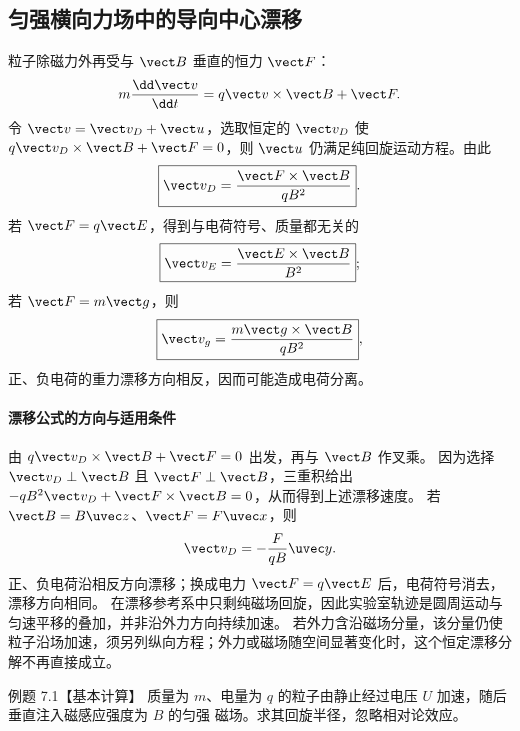 \subsection*{匀强横向力场中的导向中心漂移}

粒子除磁力外再受与 $\vect B$ 垂直的恒力 $\vect F$：
\begin{equation}
  m\frac{\dd\vect v}{\dd t}=q\vect v\times\vect B+\vect F.
\end{equation}
令 $\vect v=\vect v_D+\vect u$，选取恒定的 $\vect v_D$ 使
$q\vect v_D\times\vect B+\vect F=0$，则 $\vect u$ 仍满足纯回旋运动方程。由此
\begin{equation}
  \boxed{\vect v_D=\frac{\vect F\times\vect B}{qB^2}}.
\end{equation}
若 $\vect F=q\vect E$，得到与电荷符号、质量都无关的
\begin{equation}
  \boxed{\vect v_E=\frac{\vect E\times\vect B}{B^2}};
\end{equation}
若 $\vect F=m\vect g$，则
\begin{equation}
  \boxed{\vect v_g=\frac{m\vect g\times\vect B}{qB^2}},
\end{equation}
正、负电荷的重力漂移方向相反，因而可能造成电荷分离。

\driftDiagram



\paragraph{漂移公式的方向与适用条件}
由 $q\vect v_D\times\vect B+\vect F=0$ 出发，再与 $\vect B$ 作叉乘。
因为选择 $\vect v_D\perp\vect B$ 且 $\vect F\perp\vect B$，三重积给出
$-qB^2\vect v_D+\vect F\times\vect B=0$，从而得到上述漂移速度。
若 $\vect B=B\uvec z$、$\vect F=F\uvec x$，则
\[
 \vect v_D=-\frac{F}{qB}\uvec y.
\]
正、负电荷沿相反方向漂移；换成电力 $\vect F=q\vect E$ 后，电荷符号消去，漂移方向相同。
在漂移参考系中只剩纯磁场回旋，因此实验室轨迹是圆周运动与匀速平移的叠加，并非沿外力方向持续加速。
若外力含沿磁场分量，该分量仍使粒子沿场加速，须另列纵向方程；外力或磁场随空间显著变化时，这个恒定漂移分解不再直接成立。




\Needspace{0.31\textheight}
\begin{origexamplebox}{例题 7.1【基本计算】}
质量为 $m$、电量为 $q$ 的粒子由静止经过电压 $U$ 加速，随后垂直注入磁感应强度为 $B$ 的匀强
磁场。求其回旋半径，忽略相对论效应。
\end{origexamplebox}

